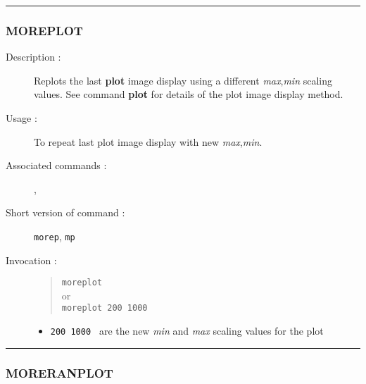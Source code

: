 \hrule 
\subsubsection*{\label{MOREPLOT}MOREPLOT}

\begin{description}

\item[Description :] Replots the last {\bf plot} image display using a
different {\it max},{\it min} scaling values.  See command {\bf plot}
for details of the plot image display method.

\item[Usage :] To repeat last plot image display with new {\it max},{\it min}.
\item[Associated commands :] {\tt {}}, 
{\tt {}}
\item[Short version of command :] {\tt morep}, {\tt mp}
\item[Invocation :]

\begin{quote}{\tt  moreplot }\\
or \\
{\tt moreplot 200 1000 }
\end{quote}

\begin{itemize}

\item {\tt 200 1000 } are the new {\it min} and {\it max} scaling values for the plot
\end{itemize}

\end{description}

\hrule 
\subsubsection*{\label{MORERANPLOT}MORERANPLOT}

